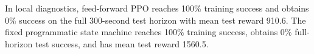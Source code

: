 In local diagnostics, feed-forward PPO reaches 100\% training success and obtains 0\% success on the full 300-second test horizon with mean test reward 910.6. The fixed programmatic state machine reaches 100\% training success, obtains 0\% full-horizon test success, and has mean test reward 1560.5.
